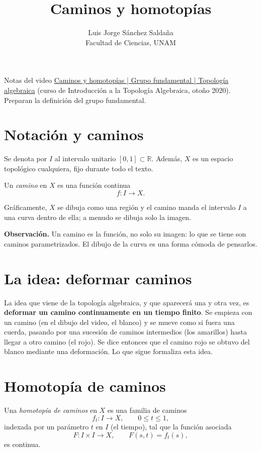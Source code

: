 \documentclass[11pt]{article}
\title{Caminos y homotopías}
\author{Luis Jorge Sánchez Saldaña\\[2pt]\small Facultad de Ciencias, UNAM}
\date{}
\begin{document}
\maketitle

\noindent\small Notas del video
\href{https://www.youtube.com/watch?v=nStpLjYHEvc}{\guillemotleft{}Caminos y homotopías | Grupo fundamental | Topología algebraica\guillemotright{}}
(curso de Introducción a la Topología Algebraica, otoño 2020). Preparan la definición del grupo fundamental.
\normalsize

\section*{Notación y caminos}

Se denota por $I$ al intervalo unitario $[0,1]\subset\mathbb{R}$. Además, $X$ es un espacio topológico cualquiera, fijo durante todo el texto.

\begin{defn}[Camino]
Un \emph{camino} en $X$ es una función continua
\[
  f\colon I\longrightarrow X .
\]
\end{defn}

Gráficamente, $X$ se dibuja como una región y el camino manda el intervalo $I$ a una curva dentro de ella; a menudo se dibuja solo la imagen.

\medskip\noindent\textbf{Observación.} Un camino es la función, no solo su imagen: lo que se tiene son caminos parametrizados. El dibujo de la curva es una forma cómoda de pensarlos.

\section*{La idea: deformar caminos}

La idea que viene de la topología algebraica, y que aparecerá una y otra vez, es \textbf{deformar un camino continuamente en un tiempo finito}. Se empieza con un camino (en el dibujo del video, el blanco) y se mueve como si fuera una cuerda, pasando por una sucesión de caminos intermedios (los amarillos) hasta llegar a otro camino (el rojo). Se dice entonces que el camino rojo se obtuvo del blanco mediante una deformación. Lo que sigue formaliza esta idea.

\section*{Homotopía de caminos}

\begin{defn}
Una \emph{homotopía de caminos} en $X$ es una familia de caminos
\[
  f_t\colon I\longrightarrow X,\qquad 0\le t\le 1,
\]
indexada por un parámetro $t$ en $I$ (el \guillemotleft{}tiempo\guillemotright{}), tal que la función asociada
\[
  F\colon I\times I\longrightarrow X,\qquad F(s,t)=f_t(s),
\]
es continua.
\end{defn}
\end{document}
